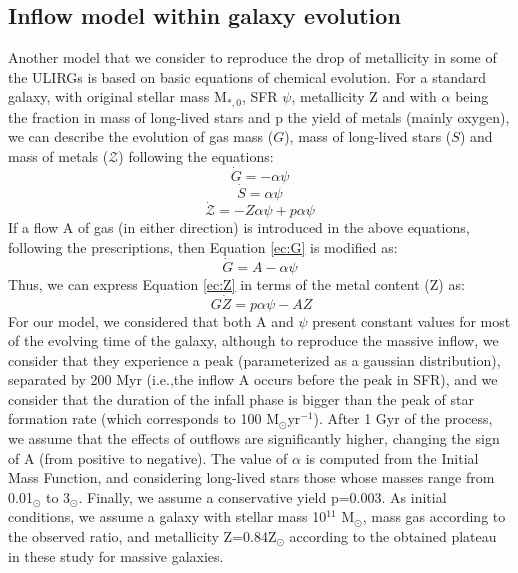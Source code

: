 \documentclass{nature2}
\newcommand{\ie}{i.e.,}
\begin{document}
\subsection{Inflow model within galaxy evolution}
Another model that we consider to reproduce the drop of metallicity in some of the ULIRGs is based on basic equations of chemical evolution. For a standard galaxy, with original stellar mass M\ensuremath{_{*,0}}, SFR \ensuremath{\psi}, metallicity Z and with \ensuremath{\alpha } being the fraction in mass of long-lived stars and p the yield of metals (mainly oxygen), we can describe the evolution of gas mass ($G$), mass of long-lived stars ($S$) and mass of metals (\ensuremath{\mathcal{Z}}) following the equations\cite{Koppen_Edmunds_1999}:
\begin{equation}
\label{ec:G} \dot{G} = - \alpha \psi
\end{equation}
\begin{equation}
\label{ec:S} \dot{S} =  \alpha \psi
\end{equation}
\begin{equation}
\label{ec:Z} \dot{\mathcal{Z}} = - Z \alpha \psi + p \alpha \psi
\end{equation}
If a flow A of gas (in either direction) is introduced in the above equations, following the prescriptions\cite{Koppen_Edmunds_1999}, then Equation \ref{ec:G} is modified as:
\begin{equation}
\label{ec:G_new} \dot{G} = A - \alpha \psi
\end{equation}
Thus, we can express Equation \ref{ec:Z} in terms of the metal content (Z) as:
\begin{equation}
\label{ec:Z_new}  \ G\dot{Z} = p\alpha \psi - A Z
\end{equation}
For our model, we considered that both A and \ensuremath{\psi } present constant values for most of the evolving time of the galaxy, although to reproduce the massive inflow, we consider that they experience a peak (parameterized as a gaussian distribution), separated by 200 Myr (\ie the inflow A occurs before the peak in SFR), and we consider that the duration of the infall phase is bigger than the peak of star formation rate (which corresponds to 100 M\ensuremath{_{\odot }}yr\ensuremath{^{-1}}). After 1 Gyr of the process, we assume that the effects of outflows are significantly higher, changing the sign of A (from positive to negative). The value of \ensuremath{\alpha} is computed from the Initial Mass Function\cite{Kroupa_2001}, and considering long-lived stars those whose masses range from 0.01\ensuremath{_{\odot }} to 3\ensuremath{_{\odot }}. Finally, we assume a conservative yield p=0.003\cite{Pilyugin_2007}. As initial conditions, we assume a galaxy with stellar mass 10\ensuremath{^{11}} M\ensuremath{_{\odot}}, mass gas according to the observed ratio\cite{Parkash_2018}, and metallicity Z=0.84Z\ensuremath{_{\odot}} according to the obtained plateau in these study for massive galaxies.
\end{document}
